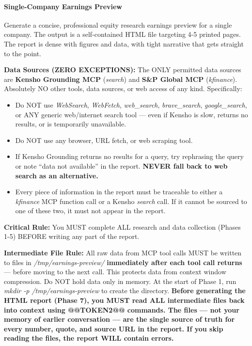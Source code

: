 \documentclass[11pt]{article}
\begin{document}
\paragraph{Single-Company Earnings Preview}\mbox{}\par

Generate a concise, professional equity research earnings preview for a single company. The output is a self-contained HTML file targeting 4-5 printed pages. The report is dense with figures and data, with tight narrative that gets straight to the point.


\textbf{Data Sources (ZERO EXCEPTIONS):} The ONLY permitted data sources are \textbf{Kensho Grounding MCP} (\emph{search}) and \textbf{S\&P Global MCP} (\emph{kfinance}). Absolutely NO other tools, data sources, or web access of any kind. Specifically:

\begin{itemize}[leftmargin=*,itemsep=2pt,topsep=2pt]
\item {} Do NOT use \emph{WebSearch}, \emph{WebFetch}, \emph{web\_\allowbreak{}search}, \emph{brave\_\allowbreak{}search}, \emph{google\_\allowbreak{}search}, or ANY generic web/internet search tool — even if Kensho is slow, returns no results, or is temporarily unavailable.
\item {} Do NOT use any browser, URL fetch, or web scraping tool.
\item {} If Kensho Grounding returns no results for a query, try rephrasing the query or note ``data not available'' in the report. \textbf{NEVER fall back to web search as an alternative.}
\item {} Every piece of information in the report must be traceable to either a \emph{kfinance} MCP function call or a Kensho \emph{search} call. If it cannot be sourced to one of these two, it must not appear in the report.
\end{itemize}

\textbf{Critical Rule:} You MUST complete ALL research and data collection (Phases 1-5) BEFORE writing any part of the report.


\textbf{Intermediate File Rule:} All raw data from MCP tool calls MUST be written to files in \emph{/tmp/earnings-preview/} \textbf{immediately after each tool call returns} — before moving to the next call. This protects data from context window compression. Do NOT hold data only in memory. At the start of Phase 1, run \emph{mkdir -p /tmp/earnings-preview} to create the directory. \textbf{Before generating the HTML report (Phase 7), you MUST read ALL intermediate files back into context using @@TOKEN2@@ commands. The files — not your memory of earlier conversation — are the single source of truth for every number, quote, and source URL in the report. If you skip reading the files, the report WILL contain errors.}
\end{document}

